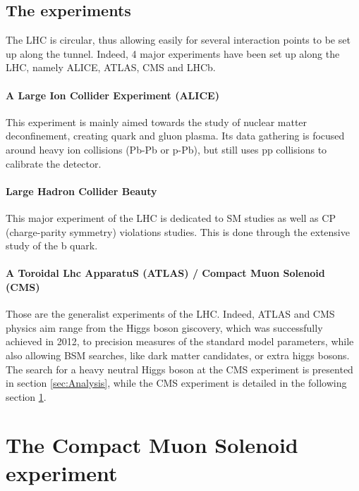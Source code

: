\subsection{The experiments}

The LHC is circular, thus allowing easily for several interaction points to be set up along the tunnel. Indeed, 4 major experiments have been set up along the LHC, namely ALICE, ATLAS, CMS and LHCb.

\paragraph{A Large Ion Collider Experiment (ALICE)} This experiment is mainly aimed towards the study of nuclear matter deconfinement, creating quark and gluon plasma. Its data gathering is focused around heavy ion collisions (Pb-Pb or p-Pb), but still uses pp collisions to calibrate the detector.

\paragraph{Large Hadron Collider Beauty} This major experiment of the LHC is dedicated to SM studies as well as CP (charge-parity symmetry) violations studies. This is done through the extensive study of the b quark.

\paragraph{A Toroidal Lhc ApparatuS (ATLAS) / Compact Muon Solenoid (CMS)} Those are the generalist experiments of the LHC. Indeed, ATLAS and CMS physics aim range from the Higgs boson giscovery, which was successfully achieved in 2012, to precision measures of the standard model parameters, while also allowing BSM searches, like dark matter candidates, or extra higgs bosons. The search for a heavy neutral Higgs boson at the CMS experiment is presented in section \ref{sec:Analysis}, while the CMS experiment is detailed in the following section \ref{sec:CMS}.


\section{The Compact Muon Solenoid experiment}
\label{sec:CMS}

